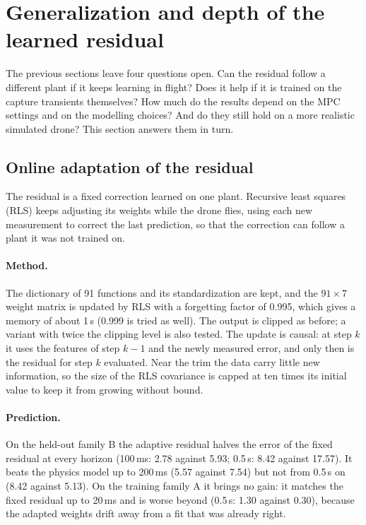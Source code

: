 \section{Generalization and depth of the learned residual}\label{sec:depth}
The previous sections leave four questions open. Can the residual follow a different plant if it keeps learning in flight? Does it help if it is trained on the capture transients themselves? How much do the results depend on the MPC settings and on the modelling choices? And do they still hold on a more realistic simulated drone? This section answers them in turn.

\subsection{Online adaptation of the residual}\label{sec:adaptive}
\begin{plain}
The residual is a fixed correction learned on one plant. Recursive least squares (RLS) keeps adjusting its weights while the drone flies, using each new measurement to correct the last prediction, so that the correction can follow a plant it was not trained on.
\end{plain}
\paragraph{Method.} The dictionary of 91 functions and its standardization are kept, and the $91\times7$ weight matrix is updated by RLS with a forgetting factor of 0.995, which gives a memory of about 1\,s (0.999 is tried as well). The output is clipped as before; a variant with twice the clipping level is also tested. The update is causal: at step $k$ it uses the features of step $k-1$ and the newly measured error, and only then is the residual for step $k$ evaluated. Near the trim the data carry little new information, so the size of the RLS covariance is capped at ten times its initial value to keep it from growing without bound.

\paragraph{Prediction.} On the held-out family B the adaptive residual halves the error of the fixed residual at every horizon (100\,ms: 2.78 against 5.93; 0.5\,s: 8.42 against 17.57). It beats the physics model up to 200\,ms (5.57 against 7.54) but not from 0.5\,s on (8.42 against 5.13). On the training family A it brings no gain: it matches the fixed residual up to 20\,ms and is worse beyond (0.5\,s: 1.30 against 0.30), because the adapted weights drift away from a fit that was already right.

